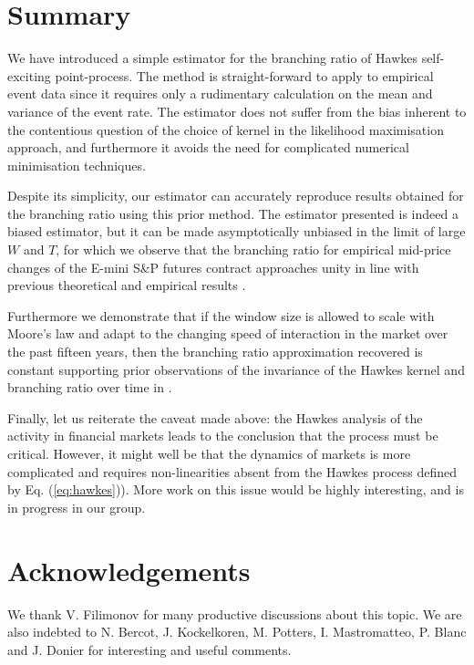 \documentclass{article}
\begin{document}
\section{Summary}

We have introduced a simple estimator for the branching ratio of Hawkes
self-exciting point-process. The method is straight-forward to apply to
empirical event data since it requires only a rudimentary calculation on the
mean and variance of the event rate. The estimator does not suffer from the
bias inherent to the contentious question of the choice of kernel in the
likelihood maximisation approach, and furthermore it avoids the need for
complicated numerical minimisation techniques.

Despite its simplicity, our estimator can accurately reproduce results
obtained for the branching ratio using this prior method. The estimator
presented is indeed a biased estimator, but it can be made asymptotically
unbiased in the limit of large $W$ and $T$, for which we observe that the
branching ratio for empirical mid-price changes of the E-mini S\&P futures
contract approaches unity in line with previous theoretical and empirical
results {\cite{criticalreflexivity}}.

Furthermore we demonstrate that if the window size is allowed to scale with
Moore's law and adapt to the changing speed of interaction in the market over
the past fifteen years, then the branching ratio approximation recovered is
constant supporting prior observations of the invariance of the Hawkes kernel
and branching ratio over time in {\cite{criticalreflexivity}}.

Finally, let us reiterate the caveat made above: the Hawkes analysis of the
activity in financial markets leads to the conclusion that the process must be
critical. However, it might well be that the dynamics of markets is more
complicated and requires non-linearities absent from the Hawkes process
defined by Eq. (\ref{eq:hawkes})). More work on this issue would be highly
interesting, and is in progress in our group.

\section*{Acknowledgements}

We thank V. Filimonov for many productive discussions about this topic. We are
also indebted to N. Bercot, J. Kockelkoren, M. Potters, I. Mastromatteo, P.
Blanc and J. Donier for interesting and useful comments.
\end{document}

